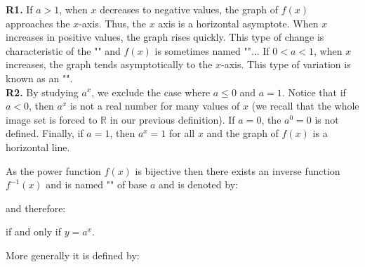 	\begin{tcolorbox}[title=Remarks,colframe=black,arc=10pt]
	\textbf{R1.} If $a>1$, when $x$ decreases to negative values, the graph of $f (x)$ approaches the $x$-axis. Thus, the $x$ axis is a horizontal asymptote. When $x$ increases in positive values, the graph rises quickly. This type of change is characteristic of the "" and $f(x)$ is sometimes named ""... If $0<a<1$, when $x$ increases, the graph tends asymptotically to the $x$-axis. This type of variation is known as an "".\\
	
	\textbf{R2.} By studying $a^x$, we exclude the case where $a\leq 0$ and $a=1$. Notice that if $a<0$, then $a^x$ is not a real number for many values of $x$ (we recall that the whole image set is forced to $\mathbb{R}$ in our previous definition). If $a=0$, the $a^0=0$ is not defined. Finally, if $a=1$, then $a^x=1$ for all $x$ and the graph of $f(x)$ is a horizontal line.
	\end{tcolorbox}
	As the power function $f (x)$ is bijective then there exists an inverse function $f^{-1}(x)$ and is named "" of base $a$ and is denoted by:
	
	and therefore:
	
	if and only if $y=a^x$.
	
	More generally it is defined by:
	
